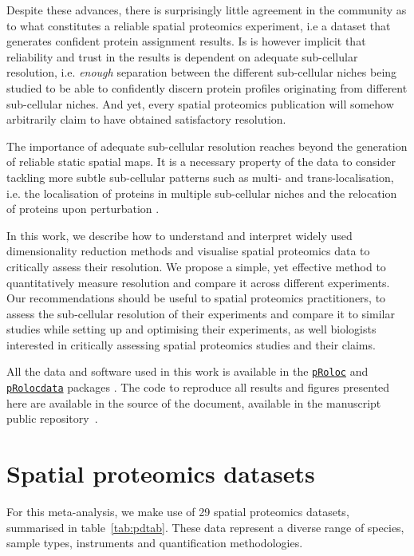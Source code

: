 \documentclass[12pt]{article}\usepackage[]{graphicx}\usepackage[]{color}
\newcommand{\Rpackage}[1]{\texttt{#1}}
\newcommand\Biocpkg[1]{%
  {\href{http://bioconductor.org/packages/#1}%
    {\Rpackage{#1}}}}
\newcommand\Biocexptpkg[1]{\Biocpkg{#1}}
\begin{document}
Despite these advances, there is surprisingly little agreement in the
community as to what constitutes a reliable spatial proteomics
experiment, i.e a dataset that generates confident protein assignment
results. Is is however implicit that reliability and trust in the
results is dependent on adequate sub-cellular resolution,
i.e. \textit{enough} separation between the different sub-cellular
niches being studied to be able to confidently discern protein profiles
originating from different sub-cellular niches. And yet, every spatial
proteomics publication will somehow arbitrarily claim to have obtained
satisfactory resolution.

The importance of adequate sub-cellular resolution reaches beyond the
generation of reliable static spatial maps. It is a necessary property
of the data to consider tackling more subtle sub-cellular patterns
such as multi- and trans-localisation, i.e. the localisation of
proteins in multiple sub-cellular niches and the relocation of
proteins upon perturbation \citep{Gatto:2014}.

\bigskip

In this work, we describe how to understand and interpret widely used
dimensionality reduction methods and visualise spatial
proteomics data to critically assess their resolution. We propose a
simple, yet effective method to quantitatively measure resolution and
compare it across different experiments. Our recommendations should be
useful to spatial proteomics practitioners, to assess the sub-cellular
resolution of their experiments and compare it to similar studies
while setting up and optimising their experiments, as well biologists
interested in critically assessing spatial proteomics studies and
their claims.

All the data and software used in this work is available in the
\Biocpkg{pRoloc} and \Biocexptpkg{pRolocdata} packages
\citep{Gatto:2014a}. The code to reproduce all results and figures
presented here are available in the source of the document, available
in the manuscript public repository~\cite{qseprepo}.

\section{Spatial proteomics datasets}\label{sec:pdata}



For this meta-analysis, we make use of 29 spatial
proteomics datasets, summarised in table~\ref{tab:pdtab}. These data
represent a diverse range of species, sample types, instruments and
quantification methodologies.
\end{document}
